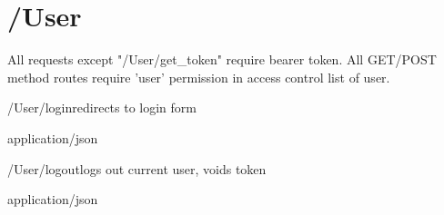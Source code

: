 \documentclass[12pt, etter]{article}
\begin{document}
\section{/User}
All requests except "/User/get\_token" require bearer token.
All GET/POST method routes require 'user' permission in access control list of user.

\begin{apiRoute}{}{/User/login}{redirects to login form}
    \begin{routeParameter}
    \end{routeParameter}
    \begin{routeResponse}{application/json}
    \end{routeResponse}
\end{apiRoute}

\begin{apiRoute}{}{/User/logout}{logs out current user, voids token}
    \begin{routeParameter}
    \end{routeParameter}
    \begin{routeResponse}{application/json}
    \end{routeResponse}
\end{apiRoute}
\end{document}
